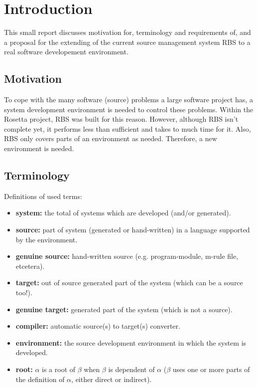 
   \RosDate{\today}
   \RosSupersedes{-}
   \MakeRosTitle

\setlength{\parskip}{2mm}
\setlength{\parindent}{0mm}

\section{Introduction}
This small report discusses motivation for, terminology and requirements of, 
and a proposal for the extending of the current source management system RBS to 
a real software developement environment.
\subsection{Motivation}
To cope with the many software (source) problems a large software project has, 
a system development environment is needed to control these problems. Within 
the Rosetta project, RBS was built for this reason. However, although RBS isn't 
complete yet, it performs less than sufficient and takes to much time for it.
Also, RBS only covers parts of an environment as needed. Therefore, a new 
environment is needed.
\subsection{Terminology}
Definitions of used terms:
\begin{itemize} 
  \item {\bf system:} the total of systems which are developed (and/or 
        generated).
  \item {\bf source:} part of system (generated or hand-written) in a language 
        supported by the environment.
  \item {\bf genuine source:} hand-written source (e.g. program-module, 
        m-rule file, etcetera).
  \item {\bf target:} out of source generated part of the system (which can be a 
        source too!).
  \item {\bf genuine target:} generated part of the system (which is not a 
        source).
  \item {\bf compiler:} automatic source(s) to target(s) converter.
  \item {\bf environment:} the source development environment in which the 
        system is developed.
  \item {\bf root:} $\alpha$ is a root of $\beta$ when $\beta$ is dependent of 
        $\alpha$ ($\beta$ uses one or more parts of the definition of $\alpha$,
        either direct or indirect).
\end{itemize}

